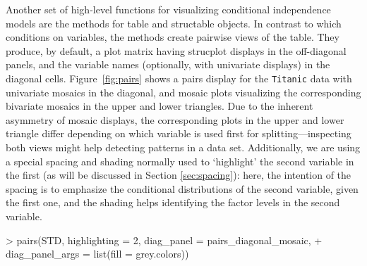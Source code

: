 \documentclass{Z}
\newcommand{\data}[1]{\texttt{#1}}
\newcommand{\class}[1]{\textsf{#1}}
\newcommand{\codefun}[1]{\code{#1()}}
\begin{document}
Another set of high-level functions for visualizing conditional independence
models are the \codefun{pairs} methods for \class{table} and \class{structable} objects.
In contrast to \codefun{cotabplot} which conditions on variables,
the \codefun{pairs} methods create pairwise views of the table. 
They produce, by default, a plot matrix 
having strucplot displays in the off-diagonal panels, and
the variable names (optionally, with univariate displays) in the diagonal cells. 
Figure~\ref{fig:pairs} shows a pairs display for the
\data{Titanic} data with univariate mosaics in the diagonal,
and mosaic plots visualizing the corresponding bivariate mosaics
in the upper and lower triangles.
Due to the inherent asymmetry of mosaic displays, the corresponding plots in the
upper and lower triangle differ depending on which variable is used first
for splitting---inspecting both views might help detecting patterns in a data set. 
Additionally, 
we are using a special spacing and shading normally used to `highlight' %
the second variable in the first (as will be discussed in Section \ref{sec:spacing}): here,
the intention of the spacing 
is to emphasize the conditional distributions of the second variable,
given the first one, and the shading helps identifying the factor levels in
the second variable.

\begin{Schunk}
\begin{Sinput}
> pairs(STD, highlighting = 2, diag_panel = pairs_diagonal_mosaic, 
+     diag_panel_args = list(fill = grey.colors))
\end{Sinput}
\end{Schunk}
\end{document}
